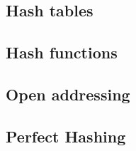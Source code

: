 \subsection{Hash tables}
\label{sub:hash_tables}

\subsection{Hash functions}
\label{sub:hash_functions}

\subsection{Open addressing}
\label{sub:open_addressing}

\subsection{Perfect Hashing}
\label{sub:perfect_hashing}






